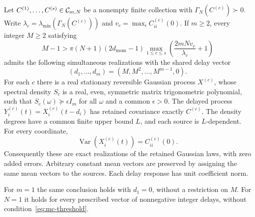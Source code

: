 \begin{theorem}\label{thm:mc-main}
Let $C^{(1)},\ldots,C^{(s)}\in\mathcal C_{m,N}$ be a nonempty finite collection
with $\Gamma_N(C^{(c)})\succ0$. Write
$\lambda_c=\lambda_{\min}(\Gamma_N(C^{(c)}))$ and
$v_c=\max_i C^{(c)}_{ii}(0)$.
If $m\ge2$, every integer $M\ge2$ satisfying
\begin{equation}\label{eq:mc-threshold}
 M-1>\pi(N+1)(2d_{\mathrm{mom}}-1)
       \max_{1\le c\le s}\left(\frac{2mN v_c}{\lambda_c}+1\right)
\end{equation}
admits the following simultaneous realizations with the shared delay vector
\begin{equation}\label{eq:mc-delays}
 (d_1,\ldots,d_m)=(M,M^2,\ldots,M^{m-1},0).
\end{equation}
For each $c$ there is a real stationary reversible Gaussian process
$X^{(c)}$, whose spectral density $S_c$ is a real, even, symmetric matrix
trigonometric polynomial, such that $S_c(\omega)\succeq\epsilon I_m$ for
all $\omega$ and a common $\epsilon>0$. The delayed process
$Y^{(c)}_i(t)=X^{(c)}_i(t-d_i)$ has retained covariance exactly $C^{(c)}$.
The density degrees have a common finite upper bound $L$, and each
source is $L$-dependent. For every coordinate,
\begin{equation}\label{eq:mc-variance}
 \operatorname{Var}(X^{(c)}_i(t))=C^{(c)}_{ii}(0).
\end{equation}
Consequently these are exact realizations of the retained Gaussian laws,
with zero added errors. Arbitrary constant mean vectors are preserved by
assigning the same mean vectors to the sources. Each delay response has
unit coefficient norm.

For $m=1$ the same conclusion holds with $d_1=0$, without a restriction
on $M$. For $N=1$ it holds for every prescribed vector of nonnegative
integer delays, without condition~\eqref{eq:mc-threshold}.
\end{theorem}

